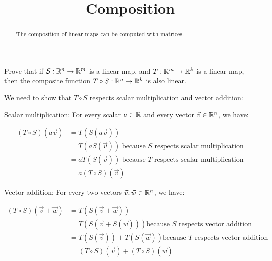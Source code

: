 \documentclass{ximera}
\title{Composition}
\begin{document}
\begin{abstract}
  The composition of linear maps can be computed with matrices.
\end{abstract}
\maketitle


Prove that if $S:\mathbb R^n \to \mathbb R^m$ is a linear map, and $T:\mathbb R^m \to \mathbb R^k$ is a linear map, then the composite function $T\circ S:\mathbb R^n \to \mathbb R^k$ is also linear.
  
\begin{free-response}
	We need to show that $T \circ S$ respects scalar multiplication and vector addition:
	
	Scalar multiplication:
	For every scalar $a \in \mathbb R$ and every vector $\vec{v} \in \mathbb R^n$, we have:
	
	\begin{align*}	
		(T\circ S)(a\vec{v}) &= T\left(S(a\vec{v})\right)\\
		&= T(aS(\vec{v})) \text{ because $S$ respects scalar multiplication}\\
		&= aT(S(\vec{v})) \text{ because $T$ respects scalar multiplication}\\
		&=a(T \circ S)(\vec{v})
	\end{align*}
	
	Vector addition:
	For every two vectors $\vec{v},\vec{w} \in \mathbb R^n$, we have:
		
		\begin{align*}
			(T \circ S)(\vec{v}+\vec{w}) &= T\left(S(\vec{v}+\vec{w})\right) \\
			&= T(S(\vec{v}+S(\vec{w}))) \text{because $S$ respects vector addition}\\
			&= T(S(\vec{v}))+T(S(\vec{w})) \text{because $T$ respects vector addition}\\
			&= (T \circ S)(\vec{v})+(T\circ S)(\vec{w})
		\end{align*}
\end{free-response}
	
\end{document}
